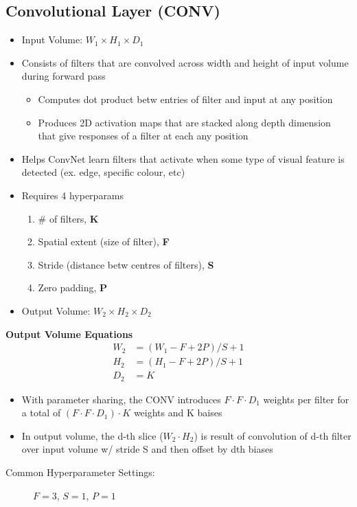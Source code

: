 \documentclass[a4paper,12pt]{article}
\begin{document}
\subsection{Convolutional Layer (CONV)}
\begin{itemize}
  \item Input Volume: $W_1\times H_1\times D_1$
  \item Consists of filters that are convolved across width and height of input volume during forward pass
  \begin{itemize}
    \item Computes dot product betw entries of filter and input at any position
    \item Produces 2D activation maps that are stacked along depth dimension that give responses of a filter at each any position
  \end{itemize}
  \item Helps ConvNet learn filters that activate when some type of visual feature is detected (ex. edge, specific colour, etc)
  \item Requires 4 hyperparams
  \begin{enumerate}
    \item \# of filters, \textbf{K}
    \item Spatial extent (size of filter), \textbf{F}
    \item Stride (distance betw centres of filters), \textbf{S}
    \item Zero padding, \textbf{P}
  \end{enumerate}
  \item Output Volume: $W_2\times H_2\times D_2$
\end{itemize}

\textbf{Output Volume Equations}
\begin{align}
  W_2 &= (W_1 - F + 2P)/S + 1 \\
  H_2 &= (H_1 - F + 2P)/S + 1 \\
  D_2 &= K
\end{align}


\begin{itemize}
  \item With parameter sharing, the CONV introduces $F\cdot F\cdot D_1$ weights per filter for a total of $(F\cdot F\cdot D_1)\cdot K$ weights and K baises
  \item In output volume, the d-th slice ($W_2\cdot H_2$) is result of convolution of d-th filter over input volume w/ stride S and then offset by dth biases
\end{itemize}
\begin{description}
  \item[Common Hyperparameter Settings:] $F = 3$, $S = 1$, $P = 1$
\end{description}
\end{document}
